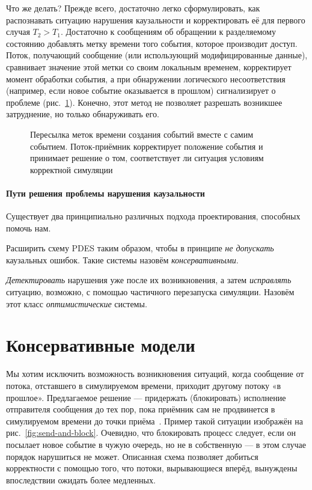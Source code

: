 Что же делать? Прежде всего, достаточно легко сформулировать, как распознавать ситуацию нарушения каузальности и корректировать её для первого случая $T_2 > T_1$. Достаточно к сообщениям об обращении к разделяемому состоянию добавлять метку времени того события, которое производит доступ. Поток, получающий сообщение (или использующий модифицированные  данные), сравнивает значение этой метки со своим локальным временем, корректирует момент обработки события, а при обнаружении логического несоответствия (например, если новое событие оказывается в прошлом) сигнализирует о проблеме (рис.~\ref{fig:timestamps}). Конечно, этот метод не позволяет разрешать возникшее затруднение, но только обнаруживать его. 

\begin{figure}[htbp]
    \centering
    \caption[Пересылка меток времени создания событий вместе с самим событием]{Пересылка меток времени создания событий вместе с самим событием. Поток-приёмник корректирует положение события и принимает решение о том, соответствует ли ситуация условиям корректной симуляции}
    \label{fig:timestamps}
\end{figure}

\paragraph{Пути решения проблемы нарушения каузальности}

Существует два принципиально различных подхода проектирования, способных помочь нам.

\begin{enumerate*}
    \item Расширить схему PDES таким образом, чтобы в принципе \emph{не допускать} каузальных ошибок. Такие системы назовём \emph{консервативными}. 
    \item \emph{Детектировать} нарушения уже после их возникновения, а затем \emph{исправлять} ситуацию, возможно, с помощью частичного перезапуска симуляции. Назовём этот класс \emph{оптимистические} системы.
\end{enumerate*}

\section[Консервативные модели]{Консервативные модели}

Мы хотим исключить возможность возникновения ситуаций, когда сообщение от потока, отставшего в симулируемом времени, приходит другому потоку «в прошлое». Предлагаемое решение — придержать (блокировать) исполнение отправителя сообщения до тех пор, пока приёмник сам не продвинется в симулируемом времени до точки приёма~\cite{Misra86distributeddiscrete-event}. Пример такой ситуации изображён на рис.~\ref{fig:send-and-block}. Очевидно, что блокировать процесс следует, если он посылает новое событие в чужую очередь, но не в собственную — в этом случае порядок нарушиться не может. Описанная схема позволяет добиться корректности с помощью того, что потоки, вырывающиеся вперёд, вынуждены впоследствии ожидать более медленных.


